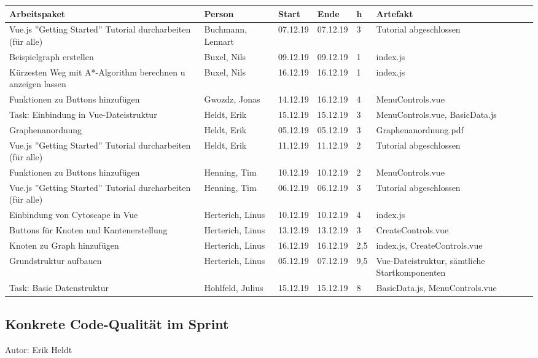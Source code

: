 \begin{longtable}{|p{4cm}|l|l|l|l|l|}
        \hline
	Arbeitspaket & Person & Start & Ende & h & Artefakt\\
        \hline
	Vue.js ''Getting Started'' Tutorial durcharbeiten (für alle) & Buchmann, Lennart & 07.12.19 & 07.12.19 & 3 & Tutorial abgeschlossen\\ \hline
	Beispielgraph erstellen & Buxel, Nils & 09.12.19 & 09.12.19 & 1 & index.js\\ \hline
	Kürzesten Weg mit A*-Algorithm berechnen u anzeigen lassen & Buxel, Nils &16.12.19 & 16.12.19 & 1 & index.js\\ \hline
	Funktionen zu Buttons hinzufügen & Gwozdz, Jonas & 14.12.19 & 16.12.19 & 4 & MenuControls.vue\\ \hline
	Task: Einbindung in Vue-Dateistruktur & Heldt, Erik & 15.12.19 & 15.12.19 & 3 & MenuControls.vue, BasicData.js\\ \hline
	Graphenanordnung & Heldt, Erik & 05.12.19 & 05.12.19 & 3 & Graphenanordnung.pdf\\ \hline
	Vue.js ''Getting Started'' Tutorial durcharbeiten (für alle) & Heldt, Erik & 11.12.19 & 11.12.19 & 2 & Tutorial abgeschlossen\\ \hline
	Funktionen zu Buttons hinzufügen & Henning, Tim & 10.12.19 & 10.12.19 & 2 & MenuControls.vue\\ \hline
	Vue.js ''Getting Started'' Tutorial durcharbeiten (für alle) & Henning, Tim & 06.12.19 & 06.12.19 & 3 & Tutorial abgeschlossen\\ \hline
	Einbindung von Cytoscape in Vue & Herterich, Linus & 10.12.19 & 10.12.19 & 4 & index.js\\ \hline
	Buttons für Knoten und Kantenerstellung & Herterich, Linus & 13.12.19 & 13.12.19 & 3 & CreateControls.vue\\ \hline
	Knoten zu Graph hinzufügen & Herterich, Linus & 16.12.19 & 16.12.19 & 2,5 & index.js, CreateControls.vue\\ \hline
	Grundstruktur aufbauen & Herterich, Linus & 05.12.19 & 07.12.19 & 9,5 & Vue-Dateistruktur, sämtliche Startkomponenten\\ \hline
	Task: Basic Datenstruktur & Hohlfeld, Julius & 15.12.19 & 15.12.19 & 8 & BasicData.js, MenuControls.vue\\ \hline
      \end{longtable}

\subsection{Konkrete Code-Qualität im Sprint}
{\small Autor: Erik Heldt}

